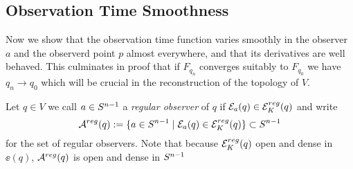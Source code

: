 \subsection{Observation Time Smoothness}
Now we show that the observation time function varies smoothly in the observer $a$ and the observerd point $p$ almost everywhere, and that its derivatives are well behaved. This culminates in proof that if $F_{q_n}$ converges suitably to $F_{q_0}$ we have $q_n\to q_0$ which will be crucial in the reconstruction of the topology of $V$.
\begin{definition}
    Let $q\in V$ we call $a\in {S^{n-1}}$ a \emph{regular observer} of $q$ if ${\mathcal{E}}_{a}(q)\in {{\mathcal{E}}^{reg}_K}(q)$ and write 
    \[
        {\mathcal{A}}^{reg}(q) := \{ a\in {S^{n-1}} \mid {\mathcal{E}}_{a}(q)\in {{\mathcal{E}}^{reg}_K}(q) \} \subset {S^{n-1}}
    \] for the set of regular observers. Note that because ${{\mathcal{E}}^{reg}_K}(q)$ open and dense in $\ee(q)$, ${{\mathcal{A}}^{reg}}(q)$ is open and dense in ${S^{n-1}}$
\end{definition}

